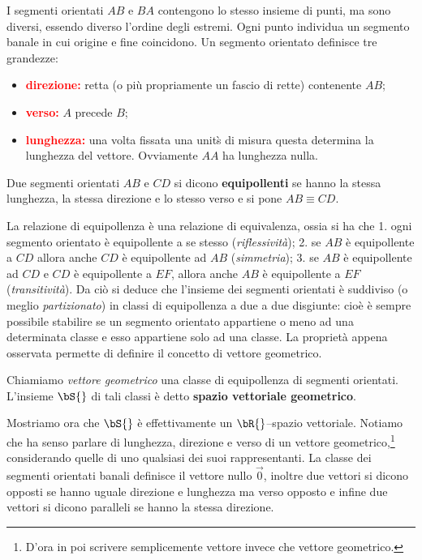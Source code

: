 I segmenti orientati $AB$ e $BA$ contengono lo stesso insieme di punti, ma sono 
diversi, 
essendo diverso l'ordine degli estremi. Ogni punto individua un segmento banale 
in cui origine 
e fine coincidono. Un segmento orientato definisce tre grandezze:
\begin{itemize}
  \item \textcolor{red}{\bf direzione:} retta (o pi\`u propriamente un fascio di 
rette) contenente $AB$;
  \item \textcolor{red}{\bf verso:} $A$ precede $B$;
  \item \textcolor{red}{\bf lunghezza:} una volta fissata una unit\`s di misura 
questa determina 
  la lunghezza del vettore. Ovviamente $AA$ ha lunghezza nulla.
\end{itemize}

\begin{definition}
  Due segmenti orientati $AB$ e $CD$ si dicono {\bf equipollenti} se hanno la 
stessa
  lunghezza, la stessa direzione e lo stesso verso e si pone $AB\equiv CD$. 
\end{definition}

La relazione di equipollenza \`e una relazione di equivalenza, ossia si ha che 
1. ogni segmento
orientato \`e equipollente a se stesso ({\it riflessivit\`a}); 
2. se $AB$ \`e equipollente a $CD$ allora anche $CD$ \`e
equipollente ad $AB$ ({\it simmetria}); 
3. se $AB$ \`e equipollente ad $CD$ e $CD$ \`e equipollente a $EF$,
allora anche $AB$ \`e equipollente a $EF$ ({\it transitivit\`a}). 
Da ci\`o si deduce che l'insieme dei segmenti
orientati \`e suddiviso (o meglio {\it partizionato}) in classi di equipollenza 
a due a due
disgiunte: cio\`e \`e sempre possibile stabilire se un segmento orientato 
appartiene o meno
ad una determinata classe e esso appartiene solo ad una classe. La propriet\`a 
appena 
osservata permette di definire il concetto di vettore geometrico.
\begin{definition}
  Chiamiamo {\it vettore geometrico} una classe di equipollenza di segmenti 
orientati. 
  L'insieme $\bS{}$ di tali classi \`e detto {\bf spazio vettoriale geometrico}.
\end{definition}

Mostriamo ora che $\bS{}$ \`e effettivamente un  $\bR{}$--spazio vettoriale. 
Notiamo che ha senso parlare 
di lunghezza, direzione e verso di un vettore geometrico,\footnote{D'ora in poi 
scrivere semplicemente vettore invece che vettore geometrico.} considerando 
quelle di uno 
qualsiasi dei suoi rappresentanti. La classe dei segmenti orientati banali 
definisce il vettore
nullo $\vec 0$, inoltre due vettori si dicono opposti se hanno uguale direzione 
e lunghezza 
ma verso opposto e infine due vettori si dicono paralleli se hanno la stessa 
direzione.

